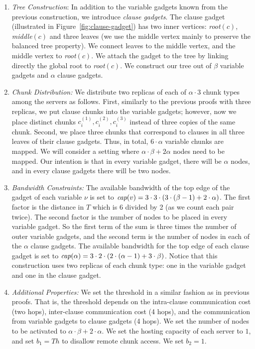 \documentclass[9pt]{sigcomm-alternate}
\newcommand{\variab}{\nu}
\newcommand{\clauses}{\alpha}
\newcommand{\vars}{\beta}
\newcommand{\capa}{\emph{cap}}
\newcommand{\Tree}{\ensuremath{T}}
\newcommand{\CostTrans}{\ensuremath{b_1}}
\newcommand{\CostCom}{\ensuremath{b_2}}
\newcommand{\Thr}{\ensuremath{Th}}
\begin{document}
\begin{appendix}
\begin{enumerate}
  \item \emph{Tree Construction}: In addition to the variable gadgets known from the 
  previous construction, we introduce \emph{clause
    gadgets}. The clause gadget (illustrated in Figure~\ref{fig:clause-gadget}) 
    has two inner vertices:
    \emph{root}$(c)$, \emph{middle}$(c)$ and three leaves (we use the middle vertex mainly to
    preserve the balanced tree property). We connect leaves to the
    middle vertex, and the middle vertex to \emph{root}$(c)$. We attach the
    gadget to the tree by linking directly the global root to
    \emph{root}$(c)$. We construct our tree out of $\vars$ variable gadgets
    and $\clauses$ clause gadgets.
  \item \emph{Chunk Distribution:}
    We distribute two replicas of each of $\clauses \cdot 3$ chunk types among the servers as follows. 
    First, similarly to the
previous proofs with three replicas, we put clause chunks into the variable
gadgets; however, now we place distinct chunks $c^{(1)}_i, c^{(2)}_i, c^{(3)}_i$
instead of three copies of the same chunk. Second, we place three
chunks that correspond to clauses in all three leaves of their clause
gadgets.  Thus, in total, $6 \cdot \clauses$ variable chunks are
mapped.  We will consider a setting where $\clauses \cdot \vars +
2\clauses$ nodes need to be mapped. Our intention is that in every
variable gadget, there will be $\clauses$ nodes, and in every clause
gadgets there will be two nodes.

  \item \emph{Bandwidth Constraints:}
    The available bandwidth of the top edge of the gadget of each variable $\variab$ is set to
$\capa(v) = 3  \cdot  3  \cdot  (3  \cdot  (\vars - 1) + 2  \cdot  \clauses)$.
The first factor is the distance in $\Tree$ which is 6 divided by 2 (as
we count each pair twice). The second factor is
the number of nodes to be placed in every variable gadget.
So the first term of the
sum is three times the number of outer variable gadgets,
and the second term is the
number of nodes in each of the $\clauses$ clause gadgets.
The available bandwidth for the top edge of each clause gadget is set to
$\capa(\clauses) = 3  \cdot  2  \cdot  (2  \cdot  (\clauses - 1) + 3  \cdot  \vars) $.
Notice that this construction uses two replicas of each chunk type:
one in the variable gadget and one in the clause gadget.

  \item \emph{Additional Properties:} We set the threshold in a
    similar fashion as in previous proofs. That is,
the threshold depends on the intra-clause communication cost (two hops), 
inter-clause communication cost (4 hops),
  and the communication from variable gadgets to clause gadgets (4 hops). We
  set the number of nodes to be activated to $\clauses \cdot \vars + 2 \cdot
  \clauses$. We set the hosting capacity of each server to $1$, and set
  $\CostTrans = \Thr$ to disallow remote chunk access. We set $\CostCom = 1$.



\end{enumerate}
\end{appendix}
\end{document}
